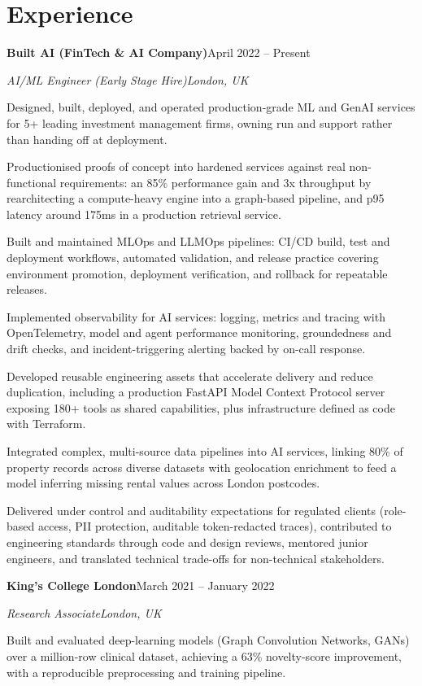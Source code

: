 \documentclass[10pt,a4paper]{article}
\newcommand{\entry}[4]{%
  {\color{company}\bfseries #1}\hfill {\color{muted}#2}\par
  \vspace{1pt}
  {\itshape #3}\hfill {\color{muted}\itshape #4}\par
  \vspace{3pt}%
}
\begin{document}
\section{Experience}
\entry{Built AI (FinTech \& AI Company)}{April 2022 -- Present}{AI/ML Engineer (Early Stage Hire)}{London, UK}
\begin{tight}
  \item Designed, built, deployed, and operated production-grade ML and GenAI services for 5+ leading investment management firms, owning run and support rather than handing off at deployment.
  \item Productionised proofs of concept into hardened services against real non-functional requirements: an 85\% performance gain and 3x throughput by rearchitecting a compute-heavy engine into a graph-based pipeline, and p95 latency around 175ms in a production retrieval service.
  \item Built and maintained MLOps and LLMOps pipelines: CI/CD build, test and deployment workflows, automated validation, and release practice covering environment promotion, deployment verification, and rollback for repeatable releases.
  \item Implemented observability for AI services: logging, metrics and tracing with OpenTelemetry, model and agent performance monitoring, groundedness and drift checks, and incident-triggering alerting backed by on-call response.
  \item Developed reusable engineering assets that accelerate delivery and reduce duplication, including a production FastAPI Model Context Protocol server exposing 180+ tools as shared capabilities, plus infrastructure defined as code with Terraform.
  \item Integrated complex, multi-source data pipelines into AI services, linking 80\% of property records across diverse datasets with geolocation enrichment to feed a model inferring missing rental values across London postcodes.
  \item Delivered under control and auditability expectations for regulated clients (role-based access, PII protection, auditable token-redacted traces), contributed to engineering standards through code and design reviews, mentored junior engineers, and translated technical trade-offs for non-technical stakeholders.
\end{tight}

\entry{King's College London}{March 2021 -- January 2022}{Research Associate}{London, UK}
\begin{tight}
  \item Built and evaluated deep-learning models (Graph Convolution Networks, GANs) over a million-row clinical dataset, achieving a 63\% novelty-score improvement, with a reproducible preprocessing and training pipeline.
\end{tight}
\end{document}
